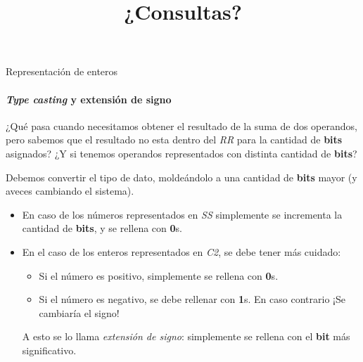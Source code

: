 \documentclass[11pt,a4paper,spanish]{beamer}
\begin{document}
\begin{frame}{Representación de enteros}
    \framesubtitle{\emph{Type casting} y extensión de signo}

    ¿Qué pasa cuando necesitamos obtener el resultado de la suma de dos
    operandos, pero sabemos que el resultado no esta dentro del \emph{RR} para
    la cantidad de \textbf{bits} asignados? ¿Y si tenemos operandos
    representados con distinta cantidad de \textbf{bits}?

    Debemos convertir el tipo de dato, moldeándolo a una cantidad de
    \textbf{bits} mayor (y aveces cambiando el sistema).\pause

    \begin{itemize}
        \item En caso de los números representados en \emph{SS} simplemente se
            incrementa la cantidad de \textbf{bits}, y se rellena con
            \textbf{0}s. \pause

        \item En el caso de los enteros representados en \emph{C2}, se debe
            tener más cuidado:\pause
        \begin{itemize}
            \item Si el número es positivo, simplemente se rellena con
                \textbf{0}s.
            \item Si el número es negativo, se debe rellenar con
                \textbf{1}s. En caso contrario ¡Se cambiaría el signo!
                \pause
        \end{itemize}
            A esto se lo llama \emph{extensión de signo}: simplemente se
            rellena con el \textbf{bit} más significativo.
    \end{itemize}

\end{frame}



\begin{frame}

\title{¿Consultas?}
\maketitle

\end{frame}

\setcounter{lastPage}{\number\value{page}}

\setcounter{page}{\number\value{lastPage}}
\end{document}
